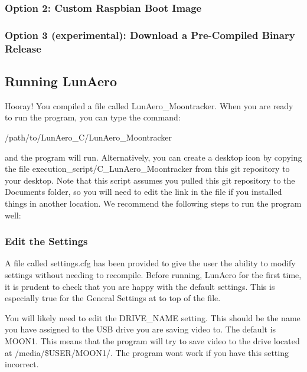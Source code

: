 \subsubsection*{Option 2\+: Custom Raspbian Boot Image}

\subsubsection*{Option 3 (experimental)\+: Download a Pre-\/\+Compiled Binary Release}

\subsection*{Running Lun\+Aero}

Hooray! You compiled a file called {\ttfamily Lun\+Aero\+\_\+\+Moontracker}. When you are ready to run the program, you can type the command\+: 
\begin{DoxyCode}
/path/to/LunAero\_C/LunAero\_Moontracker
\end{DoxyCode}
 and the program will run. Alternatively, you can create a desktop icon by copying the file {\ttfamily execution\+\_\+script/\+C\+\_\+\+Lun\+Aero\+\_\+\+Moontracker} from this {\ttfamily git} repository to your desktop. Note that this script assumes you pulled this {\ttfamily git} repository to the Documents folder, so you will need to edit the link in the file if you installed things in another location. We recommend the following steps to run the program well\+:

\subsubsection*{Edit the Settings}

A file called {\ttfamily settings.\+cfg} has been provided to give the user the ability to modify settings without needing to recompile. Before running, Lun\+Aero for the first time, it is prudent to check that you are happy with the default settings. This is especially true for the General Settings at to top of the file.

You will likely need to edit the {\ttfamily D\+R\+I\+V\+E\+\_\+\+N\+A\+ME} setting. This should be the name you have assigned to the U\+SB drive you are saving video to. The default is {\ttfamily M\+O\+O\+N1}. This means that the program will try to save video to the drive located at {\ttfamily /media/\$\+U\+S\+ER/\+M\+O\+O\+N1/}. The program won\textquotesingle{}t work if you have this setting incorrect.

